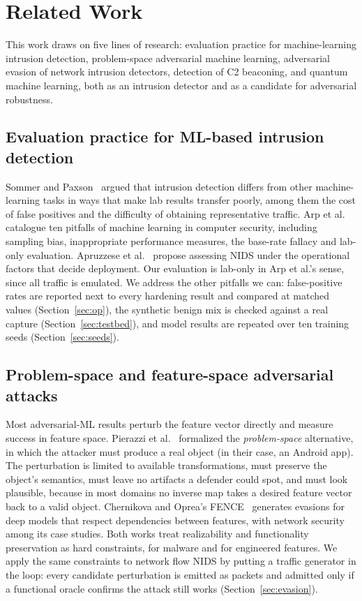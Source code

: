 \documentclass[preprint,12pt]{elsarticle}
\begin{document}
\section{Related Work}
\label{sec:related}

This work draws on five lines of research: evaluation practice for machine-learning intrusion
detection, problem-space adversarial machine learning, adversarial evasion of network intrusion
detectors, detection of C2 beaconing, and quantum machine learning, both as an intrusion detector and as
a candidate for adversarial robustness.

\subsection{Evaluation practice for ML-based intrusion detection}
Sommer and Paxson~\cite{sommer2010} argued that intrusion detection differs from other machine-learning
tasks in ways that make lab results transfer poorly, among them the cost of false positives and the
difficulty of obtaining representative traffic. Arp et al.~\cite{arp2022} catalogue ten pitfalls of
machine learning in computer security, including sampling bias, inappropriate performance measures, the
base-rate fallacy and lab-only evaluation. Apruzzese et al.~\cite{apruzzese2023sok} propose assessing
NIDS under the operational factors that decide deployment. Our evaluation is lab-only in Arp et al.'s
sense, since all traffic is emulated. We address the other pitfalls we can: false-positive rates are
reported next to every hardening result and compared at matched values (Section~\ref{sec:op}), the
synthetic benign mix is checked against a real capture (Section~\ref{sec:testbed}), and model results
are repeated over ten training seeds (Section~\ref{sec:seeds}).

\subsection{Problem-space and feature-space adversarial attacks}
Most adversarial-ML results perturb the feature vector directly and measure success in feature space.
Pierazzi et al.~\cite{pierazzi2020} formalized the \emph{problem-space} alternative, in which the
attacker must produce a real object (in their case, an Android app). The perturbation is limited to
available transformations, must preserve the object's semantics, must leave no artifacts a defender
could spot, and must look plausible, because in most domains no inverse map takes a desired feature
vector back to a valid object. Chernikova and Oprea's FENCE~\cite{fence2022} generates evasions for
deep models that respect dependencies between features, with network security among its case studies.
Both works treat realizability and functionality preservation as hard constraints, for malware and for
engineered features. We apply the same constraints to network flow NIDS by putting a traffic generator
in the loop: every candidate perturbation is emitted as packets and admitted only if a functional
oracle confirms the attack still works (Section~\ref{sec:evasion}).
\end{document}
